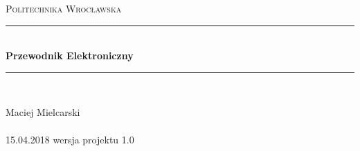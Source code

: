 \documentclass{article}
\begin{document}
\begin{titlepage} 
	\newcommand{\HRule}{\rule{\linewidth}{0.5mm}} 
	
	\center 
	
	
	\textsc{\LARGE Politechnika Wrocławska}\\[1.5cm] %
	
	
	
	
	\HRule\\[0.4cm]
	
	{\huge\bfseries Przewodnik Elektroniczny}\\[0.4cm] %
	
	\HRule\\[1.5cm]
	
	

\vfill\vfill\vfill %
	
	{\large Maciej Mielcarski \\~\\15.04.2018 wersja projektu 1.0 } %
	
\end{titlepage}
\end{document}
